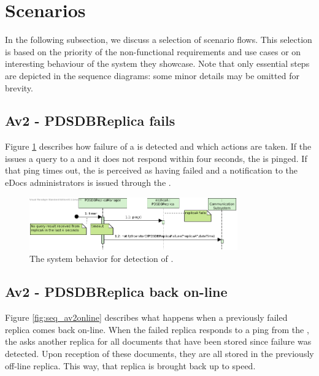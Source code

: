 \section{Scenarios}\label{sec:scenarios}
In the following subsection, we discuss a selection of scenario flows. This selection is based on the priority of the non-functional requirements and use cases or on interesting behaviour of the system they showcase. Note that only essential steps are depicted in the sequence diagrams: some minor details may be omitted for brevity.

\subsection{Av2 - PDSDBReplica fails}
Figure \ref{fig:seq_av2fail} describes how failure of a  is detected and which actions are taken. If the  issues a query to a  and it does not respond within four seconds, the  is pinged. If that ping times out, the  is perceived as having failed and a notification to the eDocs administrators is issued through the .

\begin{figure}[!htp]
    \centering
    \includegraphics[width=0.8\textwidth]{figures/Av2 - PDSDBReplica fails.png}
    \caption{The system behavior for detection of .
        }\label{fig:seq_av2fail}
\end{figure}

\subsection{Av2 - PDSDBReplica back on-line}
Figure \ref{fig:seq_av2online} describes what happens when a previously failed replica comes back on-line. When the failed replica responds to a ping from the , the  asks another replica for all documents that have been stored since failure was detected. Upon reception of these documents, they are all stored in the previously off-line replica. This way, that replica is brought back up to speed.

